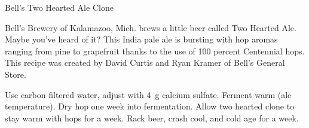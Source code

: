 \stylesection{\styleamericanipa}

\begin{recipie}{Bell's Two Hearted Ale Clone}

\begin{aboutblock}
Bell's Brewery of Kalamazoo, Mich. brews a little beer called Two Hearted Ale. Maybe
you've heard of it? This India pale ale is bursting with hop aromas ranging from pine
to grapefruit thanks to the use of 100 percent Centennial hops. This recipe was created
by David Curtis and Ryan Kramer of Bell's General Store.
\end{aboutblock}


\begin{methodandtiming}
 
\begin{mashsteps}
\end{mashsteps}

\begin{directions}
Use carbon filtered water, adjust with 4~g calcium sulfate.
Ferment warm (ale temperature). Dry hop one week into fermentation. Allow two
hearted clone to stay warm with hops for a week. Rack beer, crash cool, and cold
age for a week.
\end{directions}

\end{methodandtiming}

\pagebreak

\begin{ingredientsblock}

\begin{malts}
\end{malts}

\begin{hops}
\end{hops}

\begin{yeasts}
\end{yeasts}

\end{ingredientsblock}

\end{recipie}

